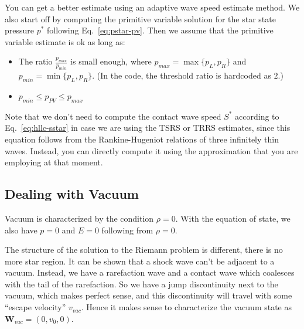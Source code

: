 You can get a better estimate using an adaptive wave speed estimate method.
We also start off by computing the primitive variable solution for the star
state pressure $p^*$ following Eq.~\ref{eq:pstar-pv}.
Then we assume that the primitive variable estimate is ok as long as:
%
%
\begin{itemize}
\item The ratio $\frac{p_{max}}{p_{min}}$ is small enough, where
	$p_{max} = \max \{ p_L, p_R \}$ and
	$p_{min} = \min \{ p_L, p_R \}$.
	(In the code, the threshold ratio is hardcoded as $2$.)
\item $p_{min} \leq p_{PV} \leq p_{max}$
\end{itemize}
%
%




Note that we don't need to compute the contact wave speed $S^*$ according to
Eq.~\ref{eq:hllc-sstar} in case we are using the TSRS or TRRS estimates, since
this equation follows from the Rankine-Hugeniot relations of three infinitely
thin waves. Instead, you can directly compute it using the approximation that
you are employing at that moment.










\subsection{Dealing with Vacuum}


Vacuum is characterized by the condition $\rho = 0$. With the equation of
state, we also have $p = 0$ and $E = 0$ following from $\rho = 0$.

The structure of the solution to the Riemann problem is different, there is no
more star region. It can be shown that a shock wave can't be adjacent to a
vacuum. Instead, we have a rarefaction wave and a contact wave which coalesces
with the tail of the rarefaction. So we have a jump discontinuity next to the
vacuum, which makes perfect sense, and this discontinuity will travel with some
``escape velocity'' $v_{vac}$.
Hence it makes sense to characterize the vacuum state as
$\mathbf{W}_{vac} = (0, v_0, 0)$.

